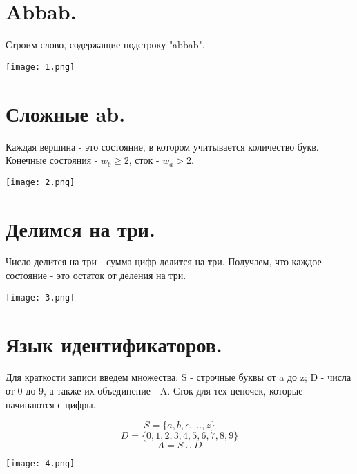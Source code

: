 \documentclass[a4paper,12pt]{article}
\author{Алексей Косенко}
\date{ВШЭ ПМИ, 2022 г.}
\theoremstyle{plain} %
\theoremstyle{definition} %
\theoremstyle{remark} %
\begin{document}
\maketitle

\section{Abbab.}
Строим слово, содержащие подстроку "abbab".

\begin{center}
\texttt{[image: 1.png]}    
\end{center}

\section{Сложные ab.}
Каждая вершина - это состояние, в котором учитывается количество букв. Конечные состояния - $w_b \geqslant 2$, сток - $w_a > 2$.    

\begin{center}
\texttt{[image: 2.png]}    
\end{center}

\section{Делимся на три.}
Число делится на три - сумма цифр делится на три. Получаем, что каждое состояние - это остаток от деления на три. 

\begin{center}
\texttt{[image: 3.png]}    
\end{center}

 \section{Язык идентификаторов.}
Для краткости записи введем множества: S - строчные буквы от a до z; D - числа от 0 до 9, а также их объединение - A. Сток для тех цепочек, которые начинаются с цифры.
 
$$S =  \{a, b, c, \dots, z\}$$
$$D = \{0, 1, 2, 3, 4, 5, 6, 7, 8, 9\}$$
$$A = S \cup D$$
 
 \begin{center}
\texttt{[image: 4.png]}    
\end{center}
\end{document}

